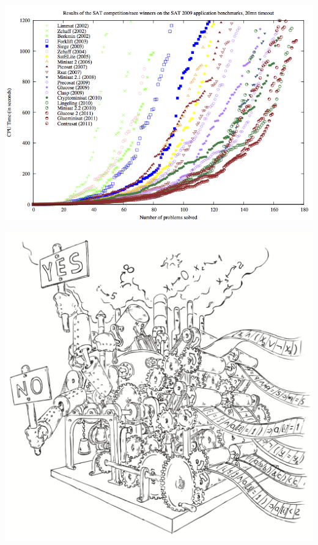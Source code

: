\documentclass{beamer}
\begin{document}
\begin{frame}{}
\includegraphics[scale=0.4]{SAT_results.png}
\end{frame}

\begin{frame}
\includegraphics[scale=0.5]{../decision-procedure.png}
\end{frame}
\end{document}
